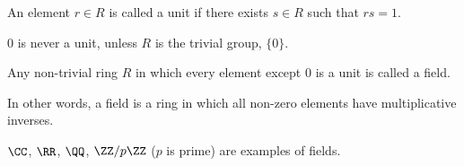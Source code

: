 
\begin{defn}
	An element $r \in R$ is called a unit if there exists $s \in R$ such that $rs = 1$.
\end{defn}

\begin{lem}
	$0$ is never a unit, unless $R$ is the trivial group, $\{0\}$.
\end{lem}

\begin{defn}
	Any non-trivial ring $R$ in which every element except $0$ is a unit is called a field.
	
	In other words, a field is a ring in which all non-zero elements have multiplicative inverses.
\end{defn}

\begin{exmp}
	$\CC$, $\RR$, $\QQ$, $\ZZ/p\ZZ$ ($p$ is prime) are examples of fields.
\end{exmp}
